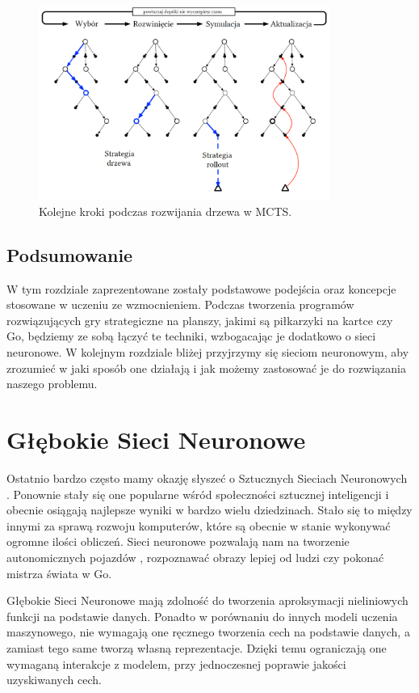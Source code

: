 \documentclass[licencjacka]{pracamgr}
\begin{document}
\begin{figure}[ht!]
  \centering
  \includegraphics[width=0.85\textwidth]{mcts}
  \caption{Kolejne kroki podczas rozwijania drzewa w MCTS. \cite{Sutton}}
\end{figure}


\section{Podsumowanie}

W tym rozdziale zaprezentowane zostały podstawowe podejścia oraz koncepcje stosowane w uczeniu ze wzmocnieniem. Podczas tworzenia programów rozwiązujących gry strategiczne na planszy, jakimi są piłkarzyki na kartce czy Go, będziemy ze sobą łączyć te techniki, wzbogacając je dodatkowo o sieci neuronowe. W kolejnym rozdziale bliżej przyjrzymy się sieciom neuronowym, aby zrozumieć w jaki sposób one działają i jak możemy zastosować je do rozwiązania naszego problemu.

\chapter{Głębokie Sieci Neuronowe}

Ostatnio bardzo często mamy okazję słyszeć o Sztucznych Sieciach Neuronowych \cite{dlbook}. Ponownie stały się one popularne wśród społeczności sztucznej inteligencji i obecnie osiągają najlepsze wyniki w bardzo wielu dziedzinach. Stało się to między innymi za sprawą rozwoju komputerów, które są obecnie w stanie wykonywać ogromne ilości obliczeń. Sieci neuronowe pozwalają nam na tworzenie autonomicznych pojazdów \cite{sdc1, sdc2}, rozpoznawać obrazy lepiej od ludzi \cite{resnet, resnext} czy pokonać mistrza świata w Go\cite{alphago2016, alphagozero}. 

Głębokie Sieci Neuronowe mają zdolność do tworzenia aproksymacji nieliniowych funkcji na podstawie danych. Ponadto w porównaniu do innych modeli uczenia maszynowego, nie wymagają one ręcznego tworzenia cech na podstawie danych, a zamiast tego same tworzą własną reprezentacje. Dzięki temu ograniczają one wymaganą interakcje z modelem, przy jednoczesnej poprawie jakości uzyskiwanych cech.
\end{document}
